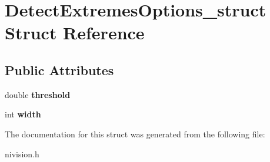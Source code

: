\hypertarget{structDetectExtremesOptions__struct}{\section{\-Detect\-Extremes\-Options\-\_\-struct \-Struct \-Reference}
\label{structDetectExtremesOptions__struct}
}
\subsection*{\-Public \-Attributes}
\begin{DoxyCompactItemize}
\item 
\hypertarget{structDetectExtremesOptions__struct_a6becea4841e8e1c664281a6ff9aae4b8}{double {\bfseries threshold}}\label{structDetectExtremesOptions__struct_a6becea4841e8e1c664281a6ff9aae4b8}

\item 
\hypertarget{structDetectExtremesOptions__struct_afaffe1e4291d0fe282d69b054a968102}{int {\bfseries width}}\label{structDetectExtremesOptions__struct_afaffe1e4291d0fe282d69b054a968102}

\end{DoxyCompactItemize}


\-The documentation for this struct was generated from the following file\-:\begin{DoxyCompactItemize}
\item 
nivision.\-h\end{DoxyCompactItemize}
